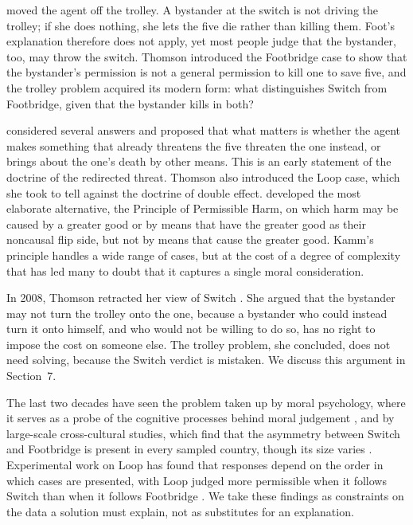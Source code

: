 \documentclass{situationist-preprint}
\begin{document}
\citet{Thomson1976} moved the agent off the trolley. A bystander at the switch is not driving the trolley; if she does nothing, she lets the five die rather than killing them. Foot's explanation therefore does not apply, yet most people judge that the bystander, too, may throw the switch. Thomson introduced the Footbridge case to show that the bystander's permission is not a general permission to kill one to save five, and the trolley problem acquired its modern form: what distinguishes Switch from Footbridge, given that the bystander kills in both?

\citet{Thomson1985} considered several answers and proposed that what matters is whether the agent makes something that already threatens the five threaten the one instead, or brings about the one's death by other means. This is an early statement of the doctrine of the redirected threat. Thomson also introduced the Loop case, which she took to tell against the doctrine of double effect. \citet{Kamm2007} developed the most elaborate alternative, the Principle of Permissible Harm, on which harm may be caused by a greater good or by means that have the greater good as their noncausal flip side, but not by means that cause the greater good. Kamm's principle handles a wide range of cases, but at the cost of a degree of complexity that has led many to doubt that it captures a single moral consideration.

In 2008, Thomson retracted her view of Switch \citep{Thomson2008}. She argued that the bystander may not turn the trolley onto the one, because a bystander who could instead turn it onto himself, and who would not be willing to do so, has no right to impose the cost on someone else. The trolley problem, she concluded, does not need solving, because the Switch verdict is mistaken. We discuss this argument in Section~7.

The last two decades have seen the problem taken up by moral psychology, where it serves as a probe of the cognitive processes behind moral judgement \citep{Greene2001,Hauser2007}, and by large-scale cross-cultural studies, which find that the asymmetry between Switch and Footbridge is present in every sampled country, though its size varies \citep{Awad2020}. Experimental work on Loop has found that responses depend on the order in which cases are presented, with Loop judged more permissible when it follows Switch than when it follows Footbridge \citep{Liao2012}. We take these findings as constraints on the data a solution must explain, not as substitutes for an explanation.
\end{document}
